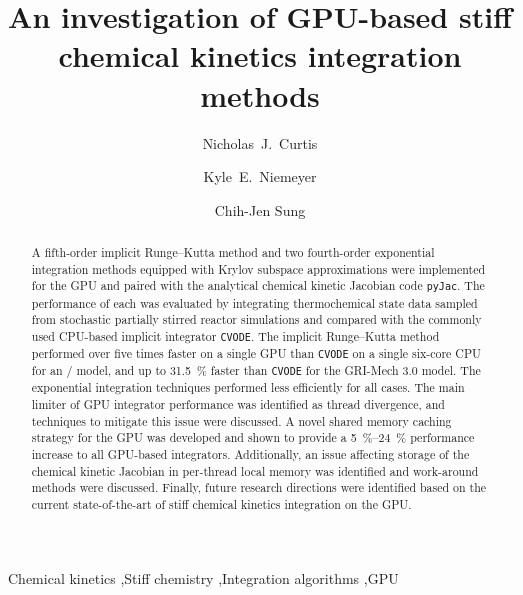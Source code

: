 \documentclass[final,twocolumn]{elsarticle}
\begin{document}
\ifmeasure
\small
\baselineskip 10pt
\fi
\begin{frontmatter}

\title{An investigation of GPU-based stiff chemical kinetics integration methods}

\author[uconn]{Nicholas~J.\ Curtis}
\author[osu]{Kyle~E.\ Niemeyer}
\author[uconn]{Chih-Jen Sung}

\address[uconn]{Department of Mechanical Engineering\\
  University of Connecticut, Storrs, CT, 06269, USA}
\address[osu]{School of Mechanical, Industrial, and Manufacturing Engineering\\
  Oregon State University, Corvallis, OR 97331, USA}
  

\begin{abstract}
A fifth-order implicit Runge--Kutta method and two fourth-order exponential integration methods equipped with Krylov subspace approximations were implemented for the GPU and paired with the analytical chemical kinetic Jacobian code \texttt{pyJac}.
The performance of each was evaluated by integrating thermochemical state data sampled from stochastic partially stirred reactor simulations and compared with the commonly used CPU-based implicit integrator \texttt{CVODE}.
The implicit Runge--Kutta method performed over five times faster on a single GPU than \texttt{CVODE} on a single six-core CPU for an \slash{} model, and up to \SI{31.5}{\percent} faster than \texttt{CVODE} for the GRI-Mech 3.0 model.
The exponential integration techniques performed less efficiently for all cases.
The main limiter of GPU integrator performance was identified as thread divergence, and techniques to mitigate this issue were discussed.
A novel shared memory caching strategy for the GPU was developed and shown to provide a \SIrange{5}{24}{\percent} performance increase to all GPU-based integrators.
Additionally, an issue affecting storage of the chemical kinetic Jacobian in per-thread local memory was identified and work-around methods were discussed.
Finally, future research directions were identified based on the current state-of-the-art of stiff chemical kinetics integration on the GPU.
\end{abstract}

\begin{keyword}
 Chemical kinetics \sep Stiff chemistry \sep Integration algorithms \sep GPU
\end{keyword}

\end{frontmatter}
\end{document}
